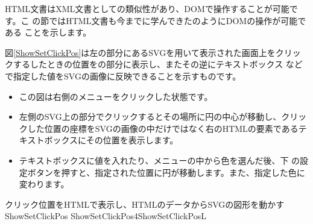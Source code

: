 \newcommand{\HTMLSVG}{HTMLと{\HS}SVG{\HS}DOM{\HS}の間でのデータ交換}
\newcommand{\HS}{\hspace{0.5em}}
\label{ExchangeDatabetweenSVGandHTML}
HTML文書はXML文書としての類似性があり、DOMで操作することが可能です。こ
の節ではHTML文書も今までに学んできた\SVG のようにDOMの操作が可能である
ことを示します。

図\ref{ShowSetClickPos}は左の部分にあるSVGを用いて表示された画面上をクリッ
クするしたときの位置を\HTML の部分に表示し、またその逆にテキストボックス
などで指定した値をSVGの画像に反映できることを示すものです。
\begin{itemize}
 \item この図は右側のメニューをクリックした状態です。
 \item 左側のSVG上の部分でクリックするとその場所に円の中心が移動し、クリッ
       クした位置の座標をSVGの画像の中だけではなく右のHTMLの要素であるテ
       キストボックスにその位置を表示します。
 \item テキストボックスに値を入れたり、メニューの中から色を選んだ後、下
の設定ボタンを押すと、指定された位置に円が移動します。また、指定した色に
変わります。
\end{itemize}

{クリック位置をHTMLで表示し、HTMLのデータからSVGの図形を動かす}{ShowSetClickPos}
%
%
{ShowSetClickPos4}{ShowSetClickPosL}

